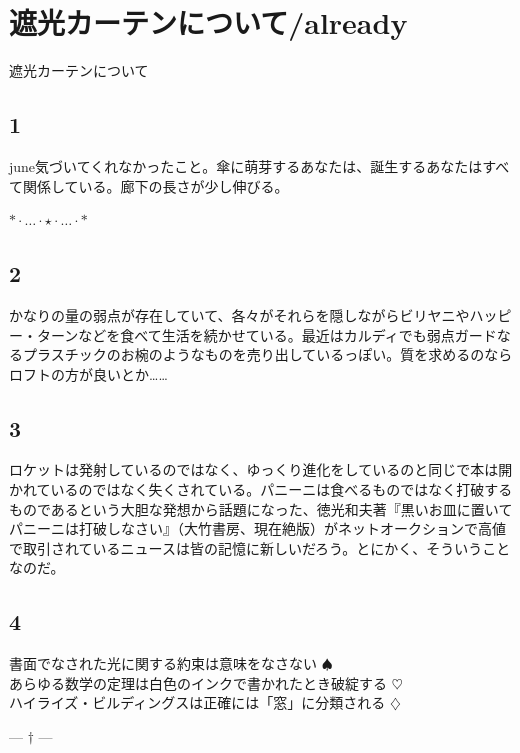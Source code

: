\section{遮光カーテンについて/already}

遮光カーテンについて

\subsection{1}
june気づいてくれなかったこと。傘に萌芽するあなたは、誕生するあなたはすべて関係している。廊下の長さが少し伸びる。
\begin{center}
$\ast \cdot \dots \cdot \star \cdot \dots \cdot \ast$
\end{center}

\subsection{2}
かなりの量の弱点が存在していて、各々がそれらを隠しながらビリヤニやハッピー・ターンなどを食べて生活を続かせている。最近はカルディでも弱点ガードなるプラスチックのお椀のようなものを売り出しているっぽい。質を求めるのならロフトの方が良いとか……

\subsection{3}
ロケットは発射しているのではなく、ゆっくり進化をしているのと同じで本は開かれているのではなく失くされている。パニーニは食べるものではなく打破するものであるという大胆な発想から話題になった、徳光和夫著『黒いお皿に置いてパニーニは打破しなさい』（大竹書房、現在絶版）がネットオークションで高値で取引されているニュースは皆の記憶に新しいだろう。とにかく、そういうことなのだ。

\subsection{4}
書面でなされた光に関する約束は意味をなさない $\spadesuit$ \\
あらゆる数学の定理は白色のインクで書かれたとき破綻する $\heartsuit$ \\
ハイライズ・ビルディングスは正確には「窓」に分類される $\diamondsuit$

\begin{center}
--- $\dagger$ ---
\end{center}

